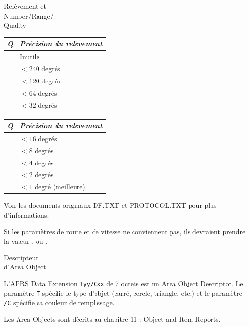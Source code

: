 \begin{aprssideblock}{Relèvement et\\Number/Range/\\Quality}
\begin{flushleft}
{\sffamily\fontsize{8.5}{10}\selectfont
\setlength{\arrayrulewidth}{1pt}
\setlength{\tabcolsep}{4pt}
\renewcommand{\arraystretch}{1.40}
\begin{tabular}{!{\vrule width 1pt}>{\centering\arraybackslash}m{24pt}!{\vrule width 1pt}>{\raggedright\arraybackslash}p{104pt}!{\vrule width 1pt}}
\hline
{}\textbf{\textit{Q}} & \textbf{\textit{Précision du relèvement}} \\
 & Inutile \\
 & $<240$ degrés \\
 & $<120$ degrés \\
 & $<64$ degrés \\
 & $<32$ degrés \\
\hline
\end{tabular}
\hspace{0.7em}
\begin{tabular}{!{\vrule width 1pt}>{\centering\arraybackslash}m{24pt}!{\vrule width 1pt}>{\raggedright\arraybackslash}p{104pt}!{\vrule width 1pt}}
\hline
{}\textbf{\textit{Q}} & \textbf{\textit{Précision du relèvement}} \\
 & $<16$ degrés \\
 & $<8$ degrés \\
 & $<4$ degrés \\
 & $<2$ degrés \\
 & $<1$ degré (meilleure) \\
\hline
\end{tabular}
}
\end{flushleft}

Voir les documents originaux DF.TXT et PROTOCOL.TXT pour plus
d'informations.
\end{aprssideblock}

\begin{aprsbodyblock}
Si les paramètres de route et de vitesse ne conviennent pas, ils
devraient prendre la valeur ,  ou
\chsevenblanktripletslash.
\end{aprsbodyblock}

\begin{aprssideblock}{Descripteur\\d'Area Object}
\label{area-object-descriptor}
L'APRS Data Extension \texttt{Tyy/Cxx} de 7 octets est un Area Object
Descriptor. Le paramètre \texttt{T} spécifie le type d'objet (carré,
cercle, triangle, etc.) et le paramètre \texttt{/C} spécifie sa couleur
de remplissage.

Les Area Objects sont décrits au chapitre 11 : Object and Item Reports.
\end{aprssideblock}
